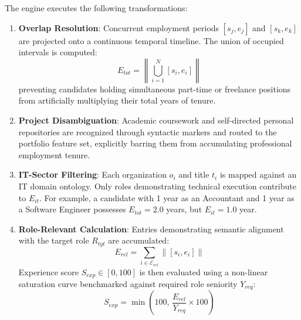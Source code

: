 \documentclass[conference]{IEEEtran}
\begin{document}
The engine executes the following transformations:
\begin{enumerate}
    \item \textbf{Overlap Resolution}: Concurrent employment periods $[s_j, e_j]$ and $[s_k, e_k]$ are projected onto a continuous temporal timeline. The union of occupied intervals is computed:
    \begin{equation}
    E_{tot} = \left\| \bigcup_{i=1}^{N} [s_i, e_i] \right\|
    \end{equation}
    preventing candidates holding simultaneous part-time or freelance positions from artificially multiplying their total years of tenure.
    \item \textbf{Project Disambiguation}: Academic coursework and self-directed personal repositories are recognized through syntactic markers and routed to the portfolio feature set, explicitly barring them from accumulating professional employment tenure.
    \item \textbf{IT-Sector Filtering}: Each organization $o_i$ and title $t_i$ is mapped against an IT domain ontology. Only roles demonstrating technical execution contribute to $E_{it}$. For example, a candidate with 1 year as an Accountant and 1 year as a Software Engineer possesses $E_{tot} = 2.0$ years, but $E_{it} = 1.0$ year.
    \item \textbf{Role-Relevant Calculation}: Entries demonstrating semantic alignment with the target role $R_{tgt}$ are accumulated:
    \begin{equation}
    E_{rel} = \sum_{i \in \mathcal{E}_{rel}} \| [s_i, e_i] \|
    \end{equation}
    Experience score $S_{exp} \in [0, 100]$ is then evaluated using a non-linear saturation curve benchmarked against required role seniority $Y_{req}$:
    \begin{equation}
    S_{exp} = \min\left(100, \, \frac{E_{rel}}{Y_{req}} \times 100\right)
    \end{equation}
\end{enumerate}
\end{document}

